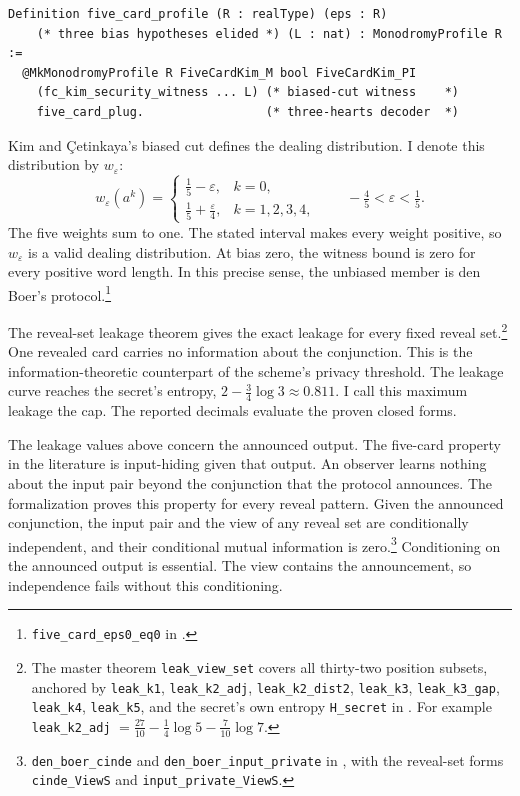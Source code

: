 \documentclass[runningheads]{llncs}
\newcommand{\coqin}[1]{\texttt{#1}}
\begin{document}
\begin{lstlisting}
Definition five_card_profile (R : realType) (eps : R)
    (* three bias hypotheses elided *) (L : nat) : MonodromyProfile R :=
  @MkMonodromyProfile R FiveCardKim_M bool FiveCardKim_PI
    (fc_kim_security_witness ... L) (* biased-cut witness    *)
    five_card_plug.                 (* three-hearts decoder  *)
\end{lstlisting}

Kim and \c{C}etinkaya's biased cut defines the dealing distribution. I denote
this distribution by $w_\varepsilon$:
\begin{equation}
  w_\varepsilon(a^k)=\begin{cases}\tfrac{1}{5}-\varepsilon, & k=0,\\[2pt]
  \tfrac{1}{5}+\tfrac{\varepsilon}{4}, & k=1,2,3,4,\end{cases}
  \qquad -\tfrac{4}{5}<\varepsilon<\tfrac{1}{5}.
  \label{eq:fivecard-weight}
\end{equation}
The five weights sum to one. The stated interval makes every weight positive,
so $w_\varepsilon$ is a valid dealing distribution.
At bias zero, the witness bound is zero for every positive word length. In
this precise sense, the unbiased member is den Boer's protocol.\footnote{\coqin{five\_card\_eps0\_eq0} in
.}

The reveal-set leakage theorem gives the exact leakage for every fixed reveal
set.\footnote{The master theorem \coqin{leak\_view\_set} covers all
thirty-two position subsets, anchored by \coqin{leak\_k1},
\coqin{leak\_k2\_adj}, \coqin{leak\_k2\_dist2}, \coqin{leak\_k3},
\coqin{leak\_k3\_gap}, \coqin{leak\_k4}, \coqin{leak\_k5}, and the secret's
own entropy \coqin{H\_secret} in
. For example
\coqin{leak\_k2\_adj} $=\tfrac{27}{10}-\tfrac14\log 5-\tfrac{7}{10}\log
7$.}
 One revealed card carries no information about the conjunction.
This is the information-theoretic counterpart of the scheme's privacy
threshold. The leakage curve reaches the secret's entropy,
$2-\tfrac34\log 3\approx 0.811$. I call this maximum leakage the cap. The
reported decimals evaluate the proven closed forms.

The leakage values above concern the announced output. The five-card property
in the literature is input-hiding given that output. An observer learns
nothing about the input pair beyond the conjunction that the protocol
announces. The formalization proves this property for every reveal pattern.
Given the announced conjunction, the input pair and the view of any reveal set
are conditionally independent, and their conditional mutual information is
zero.\footnote{\coqin{den\_boer\_cinde} and
\coqin{den\_boer\_input\_private} in
, with the
reveal-set forms \coqin{cinde\_ViewS} and \coqin{input\_private\_ViewS}.}
 Conditioning on the announced output is essential. The view
contains the announcement, so independence fails without this conditioning.
\end{document}

